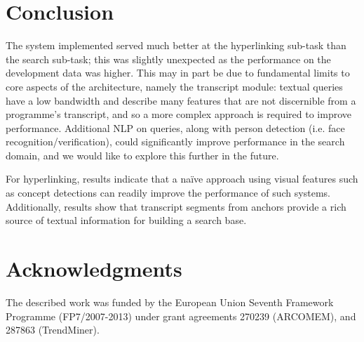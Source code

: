 \documentclass{../acm_proc_article-me11_tweaked}
\begin{document}
\section{Conclusion}
The system implemented served much better at the hyperlinking 
sub-task than the search sub-task; this was slightly unexpected as the performance on the development data was higher. This may in part be due to fundamental limits to core aspects of the architecture, namely the transcript module: textual queries have a low bandwidth and describe many features that are not discernible from a 
programme's transcript, and so a more complex approach is required to improve 
performance. Additional NLP on queries, along with person 
detection (i.e. face recognition/verification), could significantly improve performance in the search domain, and we would like to explore this further in the future.

For hyperlinking, results indicate that a naïve approach using visual features 
such as concept detections can readily improve the performance of such 
systems. Additionally, results show that transcript segments from anchors 
provide a rich source of textual information for building a search base.

\section{Acknowledgments}
The described work was funded by the European Union Seventh Framework Programme (FP7/2007-2013) under grant agreements 270239 (ARCOMEM), and 287863 (TrendMiner).



\end{document}
